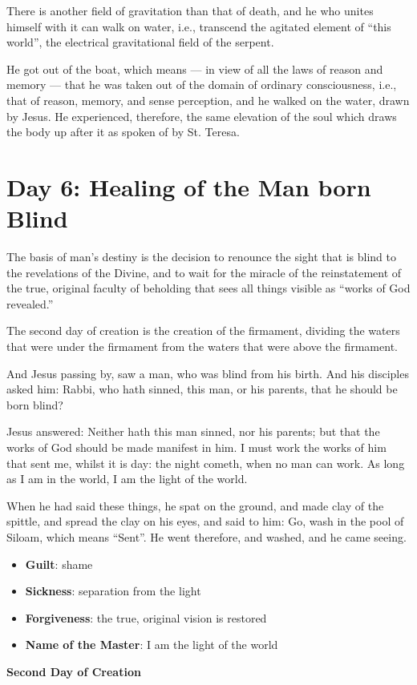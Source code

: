 There is another field of gravitation than that of death, and he who unites himself with it can walk on water, i.e., transcend the agitated element of ``this world'', the electrical gravitational field of the serpent.

\begin{quotex}
He got out of the boat, which means — in view of all the laws of reason and memory — that he was taken out of the domain of ordinary consciousness, i.e., that of reason, memory, and sense perception, and he walked on the water, drawn by Jesus. He experienced, therefore, the same elevation of the soul which draws the body up after it as spoken of by St. Teresa.

\end{quotex}

\section{Day 6: Healing of the Man born Blind}

The basis of man's destiny is the decision to renounce the sight that is blind to the revelations of the Divine, and to wait for the miracle of the reinstatement of the true, original faculty of beholding that sees all things visible as ``works of God revealed.''

The second day of creation is the creation of the firmament, dividing the waters that were under the firmament from the waters that were above the firmament.

And Jesus passing by, saw a man, who was blind from his birth. And his disciples asked him: Rabbi, who hath sinned, this man, or his parents, that he should be born blind?

Jesus answered: Neither hath this man sinned, nor his parents; but that the works of God should be made manifest in him. I must work the works of him that sent me, whilst it is day: the night cometh, when no man can work. As long as I am in the world, I am the light of the world.

When he had said these things, he spat on the ground, and made clay of the spittle, and spread the clay on his eyes, and said to him: Go, wash in the pool of Siloam, which means ``Sent''. He went therefore, and washed, and he came seeing. 

\begin{itemize}
\item \textbf{Guilt}: shame 
\item \textbf{Sickness}: separation from the light 
\item \textbf{Forgiveness}: the true, original vision is restored 
\item \textbf{Name of the Master}: I am the light of the world 
\end{itemize}
\textbf{Second Day of Creation}

